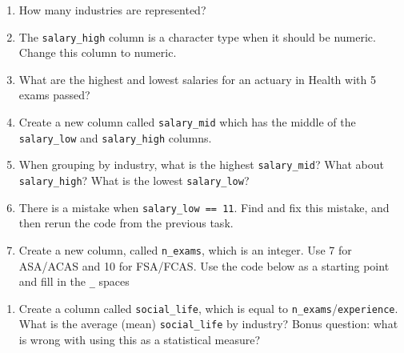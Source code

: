 \documentclass[]{book}
\newenvironment{Shaded}{\begin{snugshade}}{\end{snugshade}}
\newcommand{\DataTypeTok}[1]{\textcolor[rgb]{0.13,0.29,0.53}{#1}}
\newcommand{\KeywordTok}[1]{\textcolor[rgb]{0.13,0.29,0.53}{\textbf{#1}}}
\newcommand{\NormalTok}[1]{#1}
\newcommand{\OperatorTok}[1]{\textcolor[rgb]{0.81,0.36,0.00}{\textbf{#1}}}
\newcommand{\OtherTok}[1]{\textcolor[rgb]{0.56,0.35,0.01}{#1}}
\newcommand{\StringTok}[1]{\textcolor[rgb]{0.31,0.60,0.02}{#1}}
\providecommand{\tightlist}{%
  \setlength{\itemsep}{0pt}\setlength{\parskip}{0pt}}
\begin{document}
\begin{enumerate}
\def\labelenumi{\arabic{enumi}.}
\tightlist
\item
  How many industries are represented?
\item
  The \texttt{salary\_high} column is a character type when it should be numeric. Change this column to numeric.
\item
  What are the highest and lowest salaries for an actuary in Health with 5 exams passed?
\item
  Create a new column called \texttt{salary\_mid} which has the middle of the \texttt{salary\_low} and \texttt{salary\_high} columns.
\item
  When grouping by industry, what is the highest \texttt{salary\_mid}? What about \texttt{salary\_high}? What is the lowest \texttt{salary\_low}?
\item
  There is a mistake when \texttt{salary\_low\ ==\ 11}. Find and fix this mistake, and then rerun the code from the previous task.
\item
  Create a new column, called \texttt{n\_exams}, which is an integer. Use 7 for ASA/ACAS and 10 for FSA/FCAS. Use the code below as a starting point and fill in the \texttt{\_} spaces
\end{enumerate}

\begin{Shaded}
\end{Shaded}

\begin{enumerate}
\def\labelenumi{\arabic{enumi}.}
\setcounter{enumi}{7}
\tightlist
\item
  Create a column called \texttt{social\_life}, which is equal to \texttt{n\_exams}/\texttt{experience}. What is the average (mean) \texttt{social\_life} by industry? Bonus question: what is wrong with using this as a statistical measure?
\end{enumerate}
\end{document}
